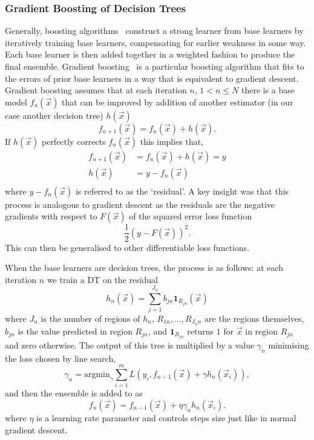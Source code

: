 \subsubsection{Gradient Boosting of Decision Trees}
Generally, boosting algorithms~\cite{Boosting} construct a strong learner from base learners by iteratively training base learners, compensating for earlier weakness in some way. Each base learner is then added together in a weighted fashion to produce the final ensemble.
Gradient boosting~\cite{GradientBoosting} is a particular boosting algorithm that fits to the errors of prior base learners in a way that is equivalent to gradient descent. Gradient boosting assumes that at each iteration $n$, $1<n\leq{N}$ there is a base model $f_{n}(\vec{x})$ that can be improved by addition of another estimator (in our case another decision tree) $h(\vec{x})$
\begin{equation}
    f_{n+1}(\vec{x}) = f_{n}(\vec{x}) + h(\vec{x}).
\end{equation}
If $h(\vec{x})$ perfectly corrects $f_{n}(\vec{x})$ this implies that,
\begin{equation}
    \begin{split}
        f_{n+1}(\vec{x}) &= f_{n}(\vec{x}) + h(\vec{x}) = y \\
        h(\vec{x}) &= y - f_{n}(\vec{x}) \\
    \end{split}
\end{equation}
where $y - f_{n}(\vec{x})$ is referred to as the `residual'. A key insight was that this process is analogous to gradient descent as the residuals are the negative gradients with respect to $F(\vec{x})$ of the squared error loss function
\begin{equation}
    \frac{1}{2}(y-F(\vec{x}))^{2}.
\end{equation}
This can then be generalised to other differentiable loss functions. 

When the base learners are decision trees, the process is as follows: at each iteration $n$ we train a DT on the residual 
\begin{equation}
    h_{n}(\vec{x}) = \sum_{j=1}^{J_{n}}b_{jn}\mathbf{1}_{R_{jn}}(\vec{x})
\end{equation}
where $J_n$ is the number of regions of $h_{n}$, $R_{1n},\dots,R_{J_{n}n}$ are the regions themselves, $b_{jn}$ is the value predicted in region $R_{jn}$, and $\mathbf{1}_{R_{jn}}$ returns $1$ for $\vec{x}$ in region $R_{jn}$ and zero otherwise. 
The output of this tree is multiplied by a value $\gamma_{n}$ minimising the loss chosen by line search,
\begin{equation}
    \gamma_{n} = \mathrm{argmin}_{\gamma}\sum_{i=1}^{m}L(y_{i},f_{n-1}(\vec{x})+\gamma{}h_{n}(\vec{x}_{i})),
\end{equation}
and then the ensemble is added to as
\begin{equation}
    f_{n}(\vec{x}) = f_{n-1}(\vec{x}) +\eta\gamma_{n}h_{n}(\vec{x}_{i}).
\end{equation}
where $\eta$ is a learning rate parameter and controls steps size just like in normal gradient descent. 




